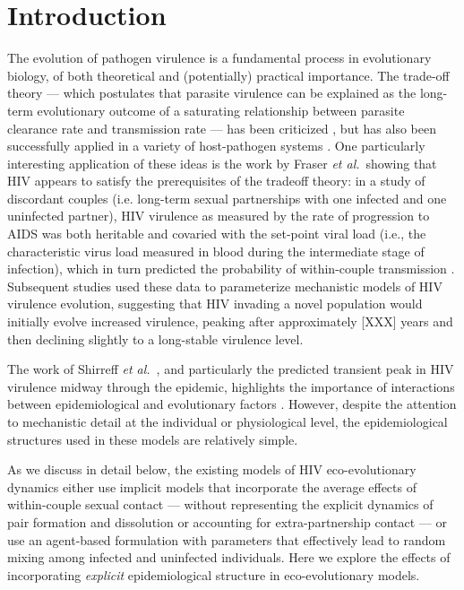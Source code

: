 \documentclass[10pt,letterpaper]{article}
\newcommand{\etal}{\textit{et al.}}
\begin{document}
\linenumbers

\section*{Introduction}


The evolution of pathogen virulence is a fundamental process in
evolutionary biology, of both theoretical and (potentially) practical
importance. The trade-off theory \cite{Ebert1999} --- which
postulates that parasite virulence can be explained as the long-term
evolutionary outcome of a saturating relationship between parasite
clearance rate and transmission rate --- has been criticized
\cite{EbertBull2003,alizon_adaptive_2015}, but has also been
successfully applied in a variety of host-pathogen systems \cite{Dwyer+1990,mackinnon1999genetic,jensen2006empirical,deroode2008virulence}. One
particularly interesting application of these ideas is the work by
Fraser \etal\ showing that HIV appears to satisfy the prerequisites of
the tradeoff theory: in a study of discordant couples (i.e. long-term
sexual partnerships with one infected and one uninfected partner), HIV
virulence as measured by the rate of progression to AIDS was both
heritable and covaried with the set-point viral load (i.e., the
characteristic virus load measured in blood during the intermediate
stage of infection), which in turn predicted the probability of
within-couple transmission
\cite{Fraser+2007,fraser_virulence_2014}. Subsequent studies
\cite{shirreff_transmission_2011,herbeck_hiv_2014} used these data to
parameterize mechanistic models of HIV virulence evolution, suggesting
that HIV invading a novel population would initially evolve increased
virulence, peaking after approximately [XXX] years and then declining
slightly to a long-stable virulence level.

The work of Shirreff \etal\ \cite{shirreff_transmission_2011}, and particularly the predicted
transient peak in HIV virulence midway through the epidemic,
highlights the importance of interactions between epidemiological and
evolutionary factors \cite{day_virulence_2004,alizon_price_2009}.
However, despite the attention to mechanistic detail at the individual
or physiological level, the epidemiological structures used in these
models are relatively simple.

As we discuss in detail below, the
existing models of HIV eco-evolutionary dynamics either use implicit
models that incorporate the average effects of within-couple sexual
contact --- without representing the explicit dynamics of pair
formation and dissolution or accounting for extra-partnership contact
--- or use an agent-based formulation with parameters that effectively
lead to random mixing among infected and uninfected individuals. Here
we explore the effects of incorporating \emph{explicit}
epidemiological structure in eco-evolutionary models.
\end{document}

